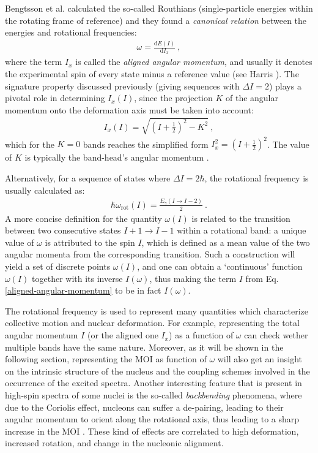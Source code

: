 Bengtsson et al. \cite{bengtsson1979quasiparticle} calculated the so-called Routhians (single-particle energies within the rotating frame of reference) and they found a \emph {canonical relation} between the energies and rotational frequencies:
\begin{align}
    \omega=\frac{\text{d}E(I)}{\text{d}I_x}\ ,
    \label{rotational-frequency-canonical-definition}
\end{align}
where the term $I_x$ is called the \emph{aligned angular momentum}, and usually it denotes the experimental spin of every state minus a reference value (see Harris \cite{harris1965higher}). The signature property discussed previously (giving sequences with $\Delta I=2$) plays a pivotal role in determining $I_x(I)$, since the projection $K$ of the angular momentum onto the deformation axis must be taken into account:
\begin{align}
    I_x(I)=\sqrt{\left(I+\frac{1}{2}\right)^2-K^2}\ ,
    \label{aligned-angular-momentum}
\end{align}
which for the $K=0$ bands reaches the simplified form $I_x^2=(I+\frac{1}{2})^2$. The value of $K$ is typically the band-head's angular momentum \cite{bengtsson1979quasiparticle,bengtsson1984signature}. 

Alternatively, for a sequence of states where $\Delta I=2\hbar$, the rotational frequency is usually calculated as:
\begin{align}
    \hbar\omega_\text{rot}(I)=\frac{E_\gamma(I\to I-2)}{2}\ .
    \label{rotational-frequency-canonical}
\end{align}
A more concise definition for the quantity $\omega(I)$ is related to the transition between two consecutive states $I+1\to I-1$ within a rotational band: a unique value of $\omega$ is attributed to the spin $I$, which is defined as a mean value of the two angular momenta from the corresponding transition. Such a construction will yield a set of discrete points $\omega(I)$, and one can obtain a `continuous' function $\omega(I)$ together with its inverse $I(\omega)$, thus making the term $I$ from Eq. \ref{aligned-angular-momentum} to be in fact $I(\omega)$.

The rotational frequency is used to represent many quantities which characterize collective motion and nuclear deformation. For example, representing the total angular momentum $I$ (or the aligned one $I_x$) as a function of $\omega$ can check wether multiple bands have the same nature. Moreover, as it will be shown in the following section, representing the MOI as function of $\omega$ will also get an insight on the intrinsic structure of the nucleus and the coupling schemes involved in the occurrence of the excited spectra. Another interesting feature that is present in high-spin spectra of some nuclei is the so-called \emph{backbending} phenomena, where due to the Coriolis effect, nucleons can suffer a de-pairing, leading to their angular momentum to orient along the rotational axis, thus leading to a sharp increase in the MOI \cite{ring2004nuclear,kvasil2004backbending}. These kind of effects are correlated to high deformation, increased rotation, and change in the nucleonic alignment.

